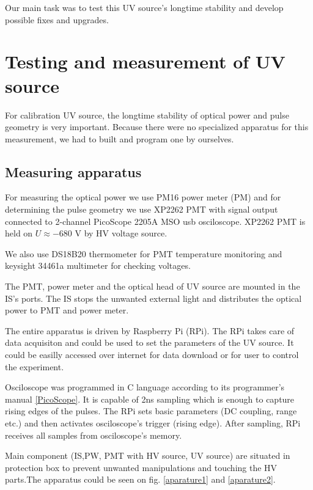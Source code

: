Our main task was to test this UV source's longtime stability and develop possible fixes and upgrades.


\section{Testing and measurement of UV source}
For calibration UV source, the longtime stability of optical power and pulse geometry is very important. Because there were no specialized apparatus for this measurement, we had to built and program one by ourselves.
\subsection{Measuring apparatus}
For measuring the optical power we use PM16 power meter (PM) and for determining the pulse geometry we use XP2262 PMT with signal output connected to 2-channel PicoScope 2205A MSO usb osciloscope. XP2262 PMT is held on $U \approx -680$ V by HV voltage source.
\par
We also use DS18B20 thermometer for PMT temperature monitoring and keysight 34461a multimeter for checking voltages.

\par
The PMT, power meter and the optical head of UV source are mounted in the IS's ports. The IS stops the unwanted external light and distributes the optical power to PMT and power meter. 
\par
The entire apparatus is driven by Raspberry Pi (RPi). The RPi takes care of data acquisiton and could be used to set the parameters of the UV source. It could be easilly accessed over internet for data download or for user to control the experiment.
\par
Osciloscope was programmed in C language according to its programmer's manual \ref{PicoScope}. It is capable of 2ns sampling which is enough to capture rising edges of the pulses. The RPi sets basic parameters (DC coupling, range etc.) and then activates osciloscope's trigger (rising edge). After sampling, RPi receives all samples from osciloscope's memory.

\par
Main component (IS,PW, PMT with HV source, UV source) are situated in protection box to prevent unwanted manipulations and touching the HV parts.The apparatus could be seen on fig. \ref{aparature1} and \ref{aparature2}.

